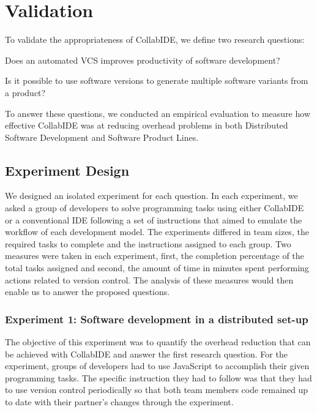 

\section{Validation}
\label{sec:validation}

To validate the appropriateness of CollabIDE, we define two research questions:
\begin{enumerate*}[label=(\arabic*)]
\item Does an automated \ac{VCS} improves productivity of software development?
\item Is it possible to use software versions to generate multiple software variants from a product?
\end{enumerate*} 
To answer these questions, we conducted an empirical evaluation 
to measure how effective CollabIDE was at reducing overhead problems 
in both Distributed Software Development and Software Product Lines.

\subsection{Experiment Design}


We designed an isolated experiment for each question. In each experiment, we asked 
a group of developers to solve programming tasks using either CollabIDE or a 
conventional IDE following a set of instructions that aimed to emulate the workflow of each development model. The experiments differed in team sizes, the required tasks to complete and the instructions assigned to each group. Two measures were taken in each experiment, first, the completion percentage of the total tasks assigned and second, the amount of time in minutes spent performing actions related to version control. The analysis of these measures would then enable us to answer the proposed questions.

\subsubsection{Experiment 1: Software development in a distributed set-up}
The objective of this experiment was to quantify the overhead reduction that can be achieved with CollabIDE and answer the first research question.
For the experiment, groups of developers had to use JavaScript to accomplish their given programming tasks. The specific instruction they had to follow was that they had to use version control periodically so that both team members code remained up to date with their partner's changes through the experiment. 


